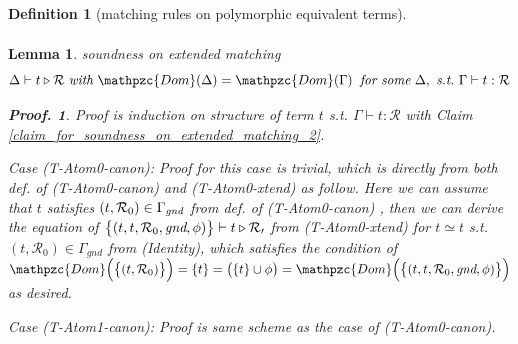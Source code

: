 \documentclass[12pt]{article}
\newtheorem{Definition}{Definition}[section]
\newtheorem{Lemma}{Lemma}[section]
\newtheorem{Proof}{Proof.}
\begin{document}
\begin{Definition}[matching rules on polymorphic equivalent terms]
\begin{displaymath}
\begin{array}{c}
    \end{array}
  \end{displaymath}
\end{Definition}


\begin{Lemma}{soundness on extended matching}
  \label{soundness_on_extended_matching}
  \[ \Delta \vdash t \triangleright \mathcal{R}\
      \text{\it with}\ \mathpzc{Dom}(\Delta) = \mathpzc{Dom}(\Gamma)\;\;
       \text{\it for some}\ \Delta,\ \text{\it s.t.}\
        \Gamma \vdash t  : \mathcal{R}
  \]
  \begin{Proof}
    Proof is induction on structure of term $t$ s.t.
    $\Gamma \vdash t : \mathcal{R}$ with
    Claim \ref{claim_for_soundness_on_extended_matching_2}.

    Case (T-Atom0-canon): Proof for this case is trivial, which is directly
    from both def. of (T-Atom0-canon) and (T-Atom0-xtend) as follow.
    Here we can assume that $t$ satisfies $(t, \mathcal{R}_0) \in
    \Gamma_\text{\it gnd}$ from def. of (T-Atom0-canon) , then we can
    derive the equation of
    $\bigl\{(t, t, \mathcal{R}_0, \text{\it gnd}, \phi) \bigr\} \vdash
    t \triangleright \mathcal{R_0}$ from (T-Atom0-xtend) for
    $t \simeq t$ s.t. $(t, \mathcal{R}_0) \in \Gamma_{gnd}$ from (Identity),
    which satisfies the condition of
    $\mathpzc{Dom}\Bigl(\bigl\{(t, \mathcal{R}_0 ) \bigr\} \Bigr) =
    \{t\} = \bigl(\{t\} \cup \phi \bigr) =
    \mathpzc{Dom}\Bigl(\bigl\{(t, t, \mathcal{R}_0, \text{\it gnd}, \phi)
    \bigr\} \Bigr)$ as desired.
    
    Case (T-Atom1-canon): Proof is same scheme as the case of
    (T-Atom0-canon).
    

\end{Proof}
\end{Lemma}
\end{document}

